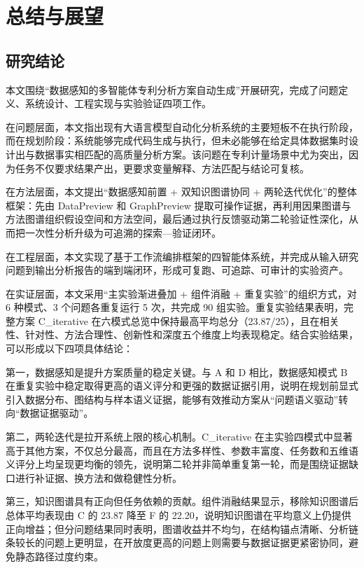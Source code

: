 \section{总结与展望}

\subsection{研究结论}

本文围绕“数据感知的多智能体专利分析方案自动生成”开展研究，完成了问题定义、系统设计、工程实现与实验验证四项工作。

在问题层面，本文指出现有大语言模型自动化分析系统的主要短板不在执行阶段，而在规划阶段：系统能够完成代码生成与执行，但未必能够在给定具体数据集时设计出与数据事实相匹配的高质量分析方案。该问题在专利计量场景中尤为突出，因为任务不仅要求结果产出，更要求变量解释、方法匹配与结论可复核。

在方法层面，本文提出“数据感知前置 + 双知识图谱协同 + 两轮迭代优化”的整体框架：先由 DataPreview 和 GraphPreview 提取可操作证据，再利用因果图谱与方法图谱组织假设空间和方法空间，最后通过执行反馈驱动第二轮验证性深化，从而把一次性分析升级为可追溯的探索—验证闭环。

在工程层面，本文实现了基于工作流编排框架的四智能体系统，并完成从输入研究问题到输出分析报告的端到端闭环，形成可复跑、可追踪、可审计的实验资产。

在实证层面，本文采用“主实验渐进叠加 + 组件消融 + 重复实验”的组织方式，对 6 种模式、3 个问题各重复运行 5 次，共完成 90 组实验。重复实验结果表明，完整方案 C\_iterative 在六模式总览中保持最高平均总分（23.87/25），且在相关性、针对性、方法合理性、创新性和深度五个维度上均表现稳定。结合实验结果，可以形成以下四项具体结论：

第一，数据感知是提升方案质量的稳定关键。与 A 和 D 相比，数据感知模式 B 在重复实验中稳定取得更高的语义评分和更强的数据证据引用，说明在规划前显式引入数据分布、图结构与样本语义证据，能够有效推动方案从“问题语义驱动”转向“数据证据驱动”。

第二，两轮迭代是拉开系统上限的核心机制。C\_iterative 在主实验四模式中显著高于其他方案，不仅总分最高，而且在方法多样性、参数丰富度、任务数和五维语义评分上均呈现更均衡的领先，说明第二轮并非简单重复第一轮，而是围绕证据缺口进行补证据、换方法和做稳健性分析。

第三，知识图谱具有正向但任务依赖的贡献。组件消融结果显示，移除知识图谱后总体平均表现由 C 的 23.87 降至 F 的 22.20，说明知识图谱在平均意义上仍提供正向增益；但分问题结果同时表明，图谱收益并不均匀，在结构锚点清晰、分析链条较长的问题上更明显，在开放度更高的问题上则需要与数据证据更紧密协同，避免静态路径过度约束。

